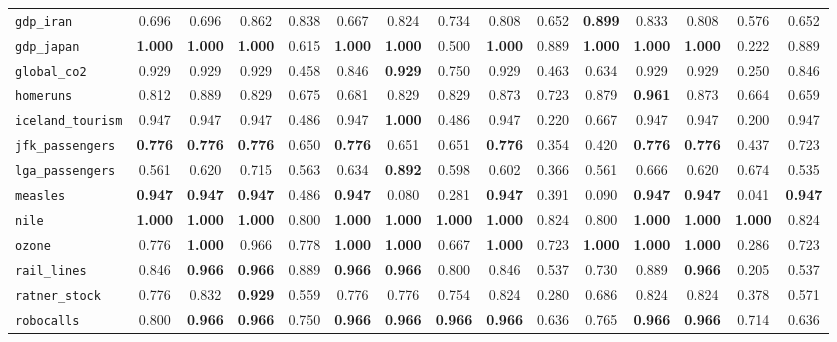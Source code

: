 \begin{tabular}{lcccccccccccccc}
\verb+gdp_iran+ & 0.696 & 0.696 & 0.862 & 0.838 & 0.667 & 0.824 & 0.734 & 0.808 & 0.652 & \textbf{0.899} & 0.833 & 0.808 & 0.576 & 0.652\\
\verb+gdp_japan+ & \textbf{1.000} & \textbf{1.000} & \textbf{1.000} & 0.615 & \textbf{1.000} & \textbf{1.000} & 0.500 & \textbf{1.000} & 0.889 & \textbf{1.000} & \textbf{1.000} & \textbf{1.000} & 0.222 & 0.889\\
\verb+global_co2+ & 0.929 & 0.929 & 0.929 & 0.458 & 0.846 & \textbf{0.929} & 0.750 & 0.929 & 0.463 & 0.634 & 0.929 & 0.929 & 0.250 & 0.846\\
\verb+homeruns+ & 0.812 & 0.889 & 0.829 & 0.675 & 0.681 & 0.829 & 0.829 & 0.873 & 0.723 & 0.879 & \textbf{0.961} & 0.873 & 0.664 & 0.659\\
\verb+iceland_tourism+ & 0.947 & 0.947 & 0.947 & 0.486 & 0.947 & \textbf{1.000} & 0.486 & 0.947 & 0.220 & 0.667 & 0.947 & 0.947 & 0.200 & 0.947\\
\verb+jfk_passengers+ & \textbf{0.776} & \textbf{0.776} & \textbf{0.776} & 0.650 & \textbf{0.776} & 0.651 & 0.651 & \textbf{0.776} & 0.354 & 0.420 & \textbf{0.776} & \textbf{0.776} & 0.437 & 0.723\\
\verb+lga_passengers+ & 0.561 & 0.620 & 0.715 & 0.563 & 0.634 & \textbf{0.892} & 0.598 & 0.602 & 0.366 & 0.561 & 0.666 & 0.620 & 0.674 & 0.535\\
\verb+measles+ & \textbf{0.947} & \textbf{0.947} & \textbf{0.947} & 0.486 & \textbf{0.947} & 0.080 & 0.281 & \textbf{0.947} & 0.391 & 0.090 & \textbf{0.947} & \textbf{0.947} & 0.041 & \textbf{0.947}\\
\verb+nile+ & \textbf{1.000} & \textbf{1.000} & \textbf{1.000} & 0.800 & \textbf{1.000} & \textbf{1.000} & \textbf{1.000} & \textbf{1.000} & 0.824 & 0.800 & \textbf{1.000} & \textbf{1.000} & \textbf{1.000} & 0.824\\
\verb+ozone+ & 0.776 & \textbf{1.000} & 0.966 & 0.778 & \textbf{1.000} & \textbf{1.000} & 0.667 & \textbf{1.000} & 0.723 & \textbf{1.000} & \textbf{1.000} & \textbf{1.000} & 0.286 & 0.723\\
\verb+rail_lines+ & 0.846 & \textbf{0.966} & \textbf{0.966} & 0.889 & \textbf{0.966} & \textbf{0.966} & 0.800 & 0.846 & 0.537 & 0.730 & 0.889 & \textbf{0.966} & 0.205 & 0.537\\
\verb+ratner_stock+ & 0.776 & 0.832 & \textbf{0.929} & 0.559 & 0.776 & 0.776 & 0.754 & 0.824 & 0.280 & 0.686 & 0.824 & 0.824 & 0.378 & 0.571\\
\verb+robocalls+ & 0.800 & \textbf{0.966} & \textbf{0.966} & 0.750 & \textbf{0.966} & \textbf{0.966} & \textbf{0.966} & \textbf{0.966} & 0.636 & 0.765 & \textbf{0.966} & \textbf{0.966} & 0.714 & 0.636\\

\end{tabular}
